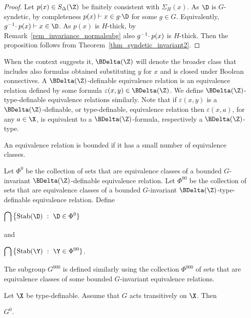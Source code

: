 \begin{proof}
  Let $p(x)\in S_\Delta(\Z)$ be finitely consistent with $\Sigma_H(x)$.
  As $\D$ is $G$-syndetic, by completeness $p(x)\vdash x\in g{\cdot}\D$ for some $g\in G$.
  Equivalently, $g^{-1}\kern-.5ex\cdot p(x)\vdash x\in\D$.
  As $p(x)$ is $H$-thick, by Remark~\ref{rem_invariance_normalsubg} also $g^{-1}\kern-.5ex\cdot p(x)$ is $H$-thick.
  Then the proposition follows from Theorem~\ref{thm_syndetic_invariant2}.
\end{proof}

When the context suggests it, $\BDelta(\Z)$ will denote the broader class that includes also formulas obtained substituting $y$ for $x$ and is closed under Boolean connectives.
A $\BDelta(\Z)$-definable equivalence relation is an equivalence relation defined by some formula $\varepsilon(x,y)\in\BDelta(\Z)$.
We define $\BDelta(\Z)$-type-definable equivalence relations similarly.
Note that if $\varepsilon(x,y)$ is a $\BDelta(\Z)$-definable, or type-definable, equivalence relation then $\varepsilon(x,a)$, for any $a\in\X$, is equivalent to a $\BDelta(\Z)$-formula, respectively a $\BDelta(\Z)$-type.

An equivalence relation is bounded if it has a small number of equivalence classes.

\begin{definition}\label{def_G00}
  Let $\Phi^0$ be the collection of sets that are equivalence classes of a bounded $G$-invariant $\BDelta(\Z)$-definable equivalence relation.
  Let $\Phi^{00}$ be the collection of sets that are equivalence classes of a bounded $G$-invariant $\BDelta(\Z)$-type-definable equivalence relation.
  Define
  \smallskip

  \medrel{=}$\displaystyle\bigcap\big\{{\rm Stab}(\D)\ :\  \D\in\Phi^0\}$

  and

  \medrel{=}$\displaystyle\bigcap\big\{{\rm Stab}(\Y)\ :\  \Y\in\Phi^{00}\}$.\medskip

  The subgroup \emph{$G^{000}$} is defined similarly using the collection $\Phi^{000}$ of sets that are equivalence classes of some bounded $G$-invariant equivalence relations.
\end{definition}

\begin{proposition}
  Let $\X$ be type-definable.
  Assume that $G$ acts transitively on $\X$.
  Then 
  
  \medrel{\leq}$G^0$.


\end{proposition}

